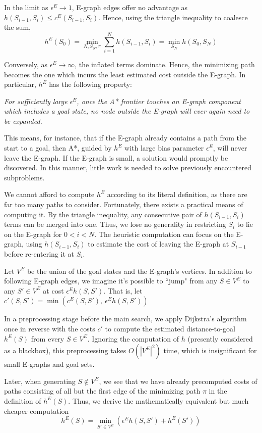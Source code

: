\documentclass[letterpaper]{article}
\begin{document}
In the limit as $\epsilon^E \rightarrow 1$, E-graph edges offer no advantage as $h(S_{i-1},S_i) \le c^E(S_{i-1},S_i)$. Hence, using the triangle inequality to coalesce the sum,
\[h^E(S_0) = \min_{N,S_N,\pi} \sum_{i=1}^N h(S_{i-1},S_i) = \min_{S_N} h(S_0,S_N)\]

Conversely, as $\epsilon^E \rightarrow\infty$, the inflated terms dominate. Hence, the minimizing path becomes the one which incurs the least estimated cost outside the E-graph. In particular, $h^E$ has the following property:

\textit{For sufficiently large $\epsilon^E$, once the A* frontier touches an E-graph component which includes a goal state, no node outside the E-graph will ever again need to be expanded.}

This means, for instance, that if the E-graph already contains a path from the start to a goal, then A*, guided by $h^E$ with large bias parameter $\epsilon^E$, will never leave the E-graph.
If the E-graph is small, a solution would promptly be discovered.
In this manner, little work is needed to solve previously encountered subproblems.

We cannot afford to compute $h^E$ according to its literal definition, as there are far too many paths to consider.
Fortunately, there exists a practical means of computing it. By the triangle inequality, any consecutive pair of $h(S_{i-1},S_i)$ terms can be merged into one.
Thus, we lose no generality in restricting $S_i$ to lie on the E-graph for $0 < i < N$.
The heuristic computation can focus on the E-graph, using $h(S_{i-1},S_i)$ to estimate the cost of leaving the E-graph at $S_{i-1}$ before re-entering it at $S_i$.

Let $V^E$ be the union of the goal states and the E-graph's vertices.
In addition to following E-graph edges, we imagine it's possible to ``jump" from any $S\in V^E$ to any $S'\in V^E$ at cost $\epsilon^E h(S,S')$.
That is, let $c'(S,S') = \min\left(c^E(S,S'),~\epsilon^E h(S,S')\right)$


In a preprocessing stage before the main search, we apply Dijkstra's algorithm once in reverse with the costs $c'$ to compute the estimated distance-to-goal $h^E(S)$ from every $S\in V^E$. Ignoring the computation of $h$ (presently considered as a blackbox), this preprocessing takes $O(|V^E|^2)$ time, which is insignificant for small E-graphs and goal sets.

Later, when generating $S \notin V^E$, we see that we have already precomputed costs of paths consisting of all but the first edge of the minimizing path $\pi$ in the definition of $h^E(S)$. Thus, we derive the mathematically equivalent but much cheaper computation
\[h^E(S) = \min_{S'\in V^E} \left(\epsilon^E h(S,S') + h^E(S')\right)\]
\end{document}
